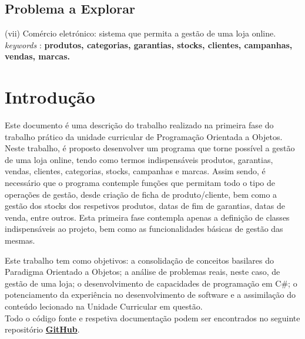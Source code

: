 \documentclass[11pt]{scrartcl} %
\begin{document}
\subsection{Problema a Explorar}
(vii) Comércio eletrónico: sistema que permita a gestão de uma loja online. \textit{keywords} : \textbf{produtos, categorias, garantias, stocks, clientes, campanhas, vendas, marcas.}

\newpage

\section{Introdução}

Este documento é uma descrição do trabalho realizado na primeira fase do trabalho prático da unidade curricular de Programação Orientada a Objetos. 
Neste trabalho, é proposto desenvolver um programa que torne possível a gestão de uma loja online, tendo como termos indispensáveis produtos, garantias, vendas, clientes, categorias, stocks, campanhas e marcas. Assim sendo, é necessário que o programa contemple funções que permitam todo o tipo de operações de gestão, desde criação de ficha de produto/cliente, bem como a gestão dos stocks dos respetivos produtos, datas de fim de garantias, datas de venda, entre outros. Esta primeira fase contempla apenas a definição de classes indispensáveis ao projeto, bem como as funcionalidades básicas de gestão das mesmas.

Este trabalho tem como objetivos: a consolidação de conceitos basilares do Paradigma Orientado a Objetos; a análise de problemas reais, neste caso, de gestão de uma loja; o desenvolvimento de capacidades de programação em C\#; o potenciamento da experiência no desenvolvimento de software e a assimilação do conteúdo lecionado na Unidade Curricular em questão.\\

Todo o código fonte e respetiva documentação podem ser encontrados no seguinte repositório \href{https://github.com/zealves99/TP_POO_27967.git}{\textbf{GitHub}}. 
\end{document}
